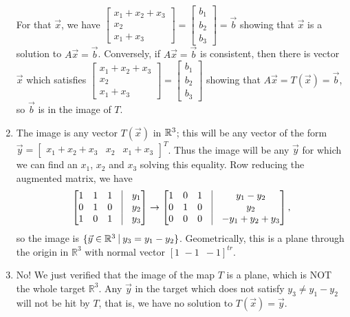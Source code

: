 \begin{SaveQuestion}
\begin{enumerate}
		For that $\vec x$, we have $\begin{bmatrix}x_1 + x_2 + x_3 \\ x_2 \\ x_1 + x_3 \end{bmatrix} = \begin{bmatrix}b_1 \\ b_2 \\ b_3 \end{bmatrix}  = \vec b$ showing that $\vec x$ is a solution to $A\vec x = \vec b$. Conversely, if
		$A\vec x = \vec b$ is consistent, then there is  vector $\vec x$ which satisfies  $\begin{bmatrix}x_1 + x_2 + x_3 \\ x_2 \\ x_1 + x_3 \end{bmatrix} = \begin{bmatrix}b_1 \\ b_2 \\ b_3 \end{bmatrix} $ showing that 
		$A\vec x = T(\vec x) = \vec b$, so $\vec b$ is in the image of $T$.
        \item The image is
		any vector $T(\vec x)$ in $\mathbb{R}^3$; this will be any vector of
		the form  
		$\vec y = \begin{bmatrix} x_1 + x_2 + x_3 & x_2 & x_1 +
		x_3\end{bmatrix}^T$.  Thus the image will be any $\vec y$ for
		which we can find an $x_1$, $x_2$ and $x_3$ solving this
		equality.  Row reducing the augmented matrix, we have 
		$$\begin{bmatrix} 1 & 1 & 1 & \vrule & y_1\\
		0 & 1 & 0 & \vrule & y_2 \\
		1 & 0 & 1 & \vrule & y_3 \end{bmatrix} \to
		\begin{bmatrix} 1 & 0 & 1 & \vrule & y_1 - y_2\\
		0 & 1 & 0 & \vrule & y_2\\
		0 & 0 & 0 & \vrule & -y_1 + y_2 + y_3 \end{bmatrix},$$
		so the image is $\{\vec y\in\bbR^3\ \vrule\ y_3 = y_1 - y_2\}$. Geometrically, this is a plane through the origin in $\mathbb R^3$ with normal vector $[1 \,\,-1\,\,\, -1]^{tr}$.
        \item No!  We just verified that the image of the map $T$ is a plane, which is NOT the whole target $\mathbb R^3$. Any $\vec y$ in the target which does not satisfy
		$y_3\ne y_1-y_2$ will not be hit by $T$, that is, we have no solution to $T(\vec x) = \vec y$.

\end{enumerate}
\end{SaveQuestion}
